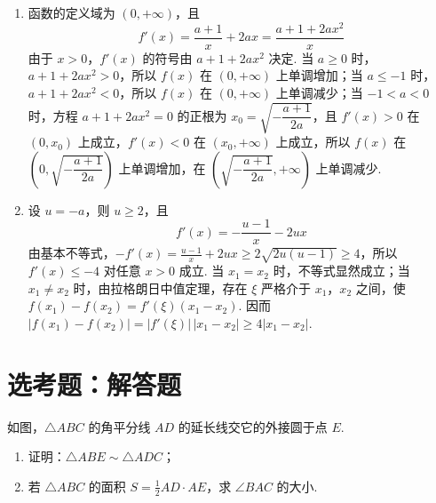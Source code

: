 \begin{solution}
\begin{enumerate}
\item 函数的定义域为 \((0,+\infty)\)，且
\[
f'(x)=\frac{a+1}{x}+2ax=\frac{a+1+2ax^2}{x}
\]
由于 \(x>0\)，\(f'(x)\) 的符号由 \(a+1+2ax^2\) 决定. 当 \(a\geqslant0\) 时，\(a+1+2ax^2>0\)，所以 \(f(x)\) 在 \((0,+\infty)\) 上单调增加；当 \(a\leqslant-1\) 时，\(a+1+2ax^2<0\)，所以 \(f(x)\) 在 \((0,+\infty)\) 上单调减少；当 \(-1<a<0\) 时，方程 \(a+1+2ax^2=0\) 的正根为 \(x_0=\sqrt{-\dfrac{a+1}{2a}}\)，且 \(f'(x)>0\) 在 \(\left(0,x_0\right)\) 上成立，\(f'(x)<0\) 在 \(\left(x_0,+\infty\right)\) 上成立，所以 \(f(x)\) 在 \(\left(0,\sqrt{-\dfrac{a+1}{2a}}\right)\) 上单调增加，在 \(\left(\sqrt{-\dfrac{a+1}{2a}},+\infty\right)\) 上单调减少.
\item 设 \(u=-a\)，则 \(u\geqslant2\)，且
\[
f'(x)=-\frac{u-1}{x}-2ux
\]
由基本不等式，\(-f'(x)=\frac{u-1}{x}+2ux\geqslant2\sqrt{2u(u-1)}\geqslant4\)，所以 \(f'(x)\leqslant-4\) 对任意 \(x>0\) 成立. 当 \(x_1=x_2\) 时，不等式显然成立；当 \(x_1\ne x_2\) 时，由拉格朗日中值定理，存在 \(\xi\) 严格介于 \(x_1\)，\(x_2\) 之间，使 \(f(x_1)-f(x_2)=f'(\xi)(x_1-x_2)\). 因而 \(|f(x_1)-f(x_2)|=|f'(\xi)|\,|x_1-x_2|\geqslant4|x_1-x_2|\).
\end{enumerate}
\end{solution}

\section{选考题：解答题}

\begin{problem}
如图，\(\triangle ABC\) 的角平分线 \(AD\) 的延长线交它的外接圆于点 \(E\).

\begin{enumerate}
\item 证明：\(\triangle ABE\sim\triangle ADC\)；
\item 若 \(\triangle ABC\) 的面积 \(S=\frac{1}{2}AD\cdot AE\)，求 \(\angle BAC\) 的大小.
\end{enumerate}

\end{problem}

